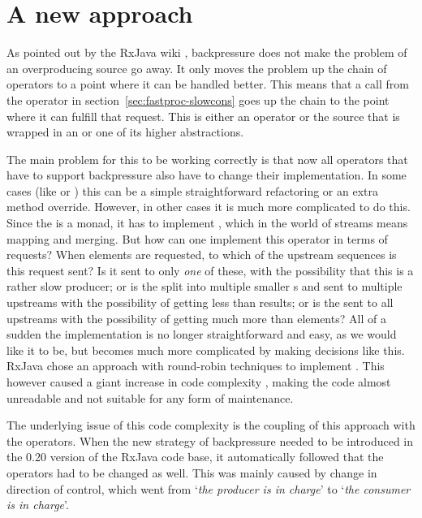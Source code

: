 \section{A new approach}
As pointed out by the RxJava wiki \cite{RxJava-Wiki-Backpressure}, backpressure does not make the problem of an overproducing source go away. It only moves the problem up the chain of operators to a point where it can be handled better. This means that a  call from the  operator in section~\ref{sec:fastproc-slowcons} goes up the chain to the point where it can fulfill that request. This is either an operator or the source that is wrapped in an  or one of its higher abstractions.

The main problem for this to be working correctly is that now all operators that have to support backpressure also have to change their implementation. In some cases (like  or ) this can be a simple straightforward refactoring or an extra method override. However, in other cases it is much more complicated to do this. Since the \obs is a monad, it has to implement , which in the world of streams means mapping and merging. But how can one implement this  operator in terms of requests? When  elements are requested, to which of the  upstream \obs sequences is this request sent? Is it sent to only \emph{one} of these, with the possibility that this is a rather slow producer; or is the  split into multiple smaller s and sent to multiple upstreams with the possibility of getting less than  results; or is the  sent to all upstreams with the possibility of getting much more than  elements? All of a sudden the implementation is no longer straightforward and easy, as we would like it to be, but becomes much more complicated by making decisions like this. RxJava chose an approach with round-robin techniques to implement . This however caused a giant increase in code complexity \cite{RxJava-source-code}, making the code almost unreadable and not suitable for any form of maintenance.

The underlying issue of this code complexity is the coupling of this approach with the operators. When the new strategy of backpressure needed to be introduced in the 0.20 version of the RxJava code base, it automatically followed that the operators had to be changed as well. This was mainly caused by change in direction of control, which went from `\textit{the producer is in charge}' to `\textit{the consumer is in charge}'.

